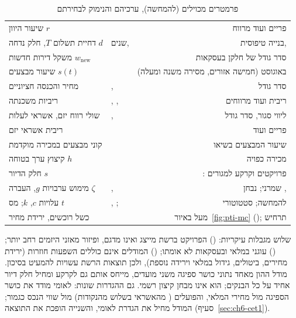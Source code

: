 \begin{table}[!htb]
\centering
\caption[פרמטרים מכוילים (להמחשה)]{פרמטרים מכוילים (להמחשה), ערכיהם והנימוק לבחירתם}
\label{tab:ch5-calibration}
\footnotesize
\begin{tabularx}{\tabmaxwidth}{>{\raggedleft\arraybackslash}p{4.0cm} >{\centering\arraybackslash}p{2.7cm} R}
\toprule
{} &  &  \\
\midrule
שיעור היוון $r$ &  & פריים ועוד מרווח \\
דחיית תשלום $T$, חלק נדחה $d$ &  שנים,  & בנייה טיפוסית,  \\
משקל דירות חדשות $w_{\mathrm{new}}$ &  & סדר גודל של חלקן בעסקאות \\
שיעור מבצעים $s(t)$ &  &  באוגוסט  (חמישה אזורים, מסירה משנה ומעלה) \cite{mof_review_2026_08} \\
מחיר והכנסה חציוניים & ,  & סדר גודל \\
ריביות משכנתה & , ,  & ריבית  ועוד מרווחים \\
שולי רווח יזם, אשראי לעלות & ,  & ליווי סגור, סדר גודל \\
ריבית אשראי יזם &  & פריים  ועוד  \\
קוני מבצעים במכירה מוקדמת &  & שיעור המבצעים בשיאו \\
קיצוץ ערך בטוחה $h$ &  & מכירה כפויה \\
חלק הדיור $s$ &  & : פרויקטים וקרקע למגורים \cite{boi_survey2025} \\
מימוש ערבויות $g$, העברה $\zeta$ & ,  & שמרני; נבחן ,  \\
עלויות $c$, $k$; מס $t$ & , ;  & להמחשה; סטטוטורי \cite{discount_q3_2026} \\
כשל רוכשים, ירידת מחיר &  &  מעל  באיור~\ref{fig:pti-mc} (); תרחיש \\
\bottomrule
\end{tabularx}
\end{table}

\label{sec:ch5-limitations}שלוש מגבלות עיקריות: () הפרויקט ברשת מייצג ואינו מדגם, ופיזור מאזני היזמים רחב יותר; () עוגני  במלאי ובעסקאות לא אומתו; () המודלים אינם כוללים השפעות חוזרות (ירידת מחירים, ביטולים, גידול במלאי וירידה נוספת), ולכן תוצאות הרשת עשויות להמעיט בסיכון. מודל ההון מאחד נתוני כושר ספיגה משני מועדים, מייחס אותם גם לקרקע ומחיל חלק דיור אחיד על כל הבנקים; הוא אינו מבחן קיצון רשמי. גם ההגדרות שונות: לאומי מודד את כושר הספיגה מול מחירי המלאי, והפועלים ( מהאשראי בשלוש מהנקודות) מול שווי הנכס כגמור; המודל מחיל את הגדרת לאומי, והשנייה הופכת את התוצאה (סעיף~\ref{sec:ch6-cet1}).
